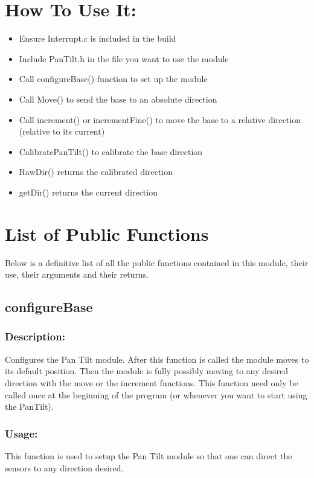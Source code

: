 \documentclass[]{report}
\begin{document}
\section{How To Use It:}
\begin{itemize}
	\item Ensure Interrupt.c is included in the build
	\item Include PanTilt.h in the file you want to use the module
	\item Call configureBase() function to set up the module
	\item Call Move() to send the base to an absolute direction
	\item Call increment() or incrementFine() to move the base to a relative direction (relative to its current)
	\item CalibratePanTilt() to calibrate the base direction
	\item RawDir() returns the calibrated direction
	\item getDir() returns the current direction
\end{itemize}

\section{List of Public Functions}
Below is a definitive list of all the public functions contained in this module, their use, their arguments and their returns.

\subsection{configureBase}
\subsubsection{Description:}
Configures the Pan Tilt module. After this function is called the module moves to its default position. Then the module is fully possibly moving to any desired direction with the move or the increment functions. This function need only be called once at the beginning of the program (or whenever you want to start using the PanTilt).

\subsubsection{Usage:}
This function is used to setup the Pan Tilt module so that one can direct the sensors to any direction desired. 
\end{document}

